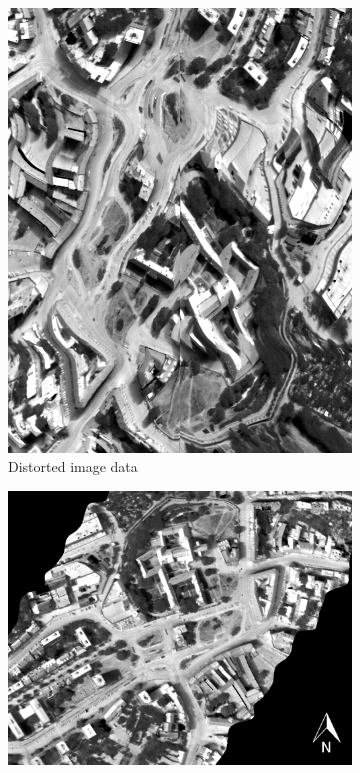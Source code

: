 \begin{figure}[thb]
	\centering
	\vspace{1em}
	\begin{subfigure}[t]{.38\linewidth}
		\centering
		\includegraphics[scale=0.24]{pics/Chapter_02/TASIcalibrated.png}
		\caption{Distorted image data}
		\label{fig:ResponseFunctions}
	\end{subfigure}
	\hspace{2em}
	\begin{subfigure}[t]{.52\linewidth}
		\centering
		\includegraphics[scale=1]{pics/Chapter_02/TASIgeoreferencedcut.png}

\end{subfigure}
\end{figure}
